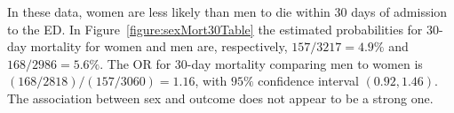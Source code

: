 In these data, women are less likely than men to die within 30 days of admission to the ED. In Figure~\ref{figure:sexMort30Table} the estimated probabilities for 30-day mortality for women and men are, respectively, $157/3217 = 4.9\%$ and $168/2986 = 5.6\%$.  The OR for 30-day mortality comparing men to women is $(168/2818)/(157/3060) = 1.16$, with $95\%$ confidence interval $(0.92, 1.46)$.  The association between sex and outcome does not appear to be a strong one.  

